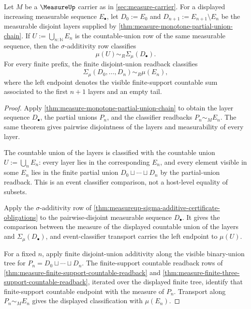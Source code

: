 \begin{theorem}
\label{thm:measure-continuity-from-below-package}
Let $M$ be a $\MeasureUp$ carrier as in \autoref{sec:measure-carrier}. For a
displayed increasing measurable sequence $E_\bullet$, let
$D_0:=E_0$ and $D_{n+1}:=E_{n+1}\setminus E_n$ be the measurable disjoint
layers supplied by
\autoref{thm:measure-monotone-partial-union-chain}. If
$U:=\bigcup_{n:\mathbb{N}}E_n$ is the countable-union row of the same
measurable sequence, then the $\sigma$-additivity row classifies
$$
\mu(U)\sim_R\Sigma_\mu(D_\bullet).
$$
For every finite prefix, the finite disjoint-union readback classifies
$$
\Sigma_\mu(D_0,\ldots,D_n)\sim_R\mu(E_n),
$$
where the left endpoint denotes the visible finite-support countable sum
associated to the first $n+1$ layers and an empty tail.
\end{theorem}
\begin{proof}
Apply \autoref{thm:measure-monotone-partial-union-chain} to obtain the layer
sequence $D_\bullet$, the partial unions $P_n$, and the classifier readbacks
$P_n\sim_M E_n$. The same theorem gives pairwise disjointness of the layers and
measurability of every layer.

The countable union of the layers is classified with the countable union
$U:=\bigcup_nE_n$: every layer lies in the corresponding $E_n$, and every
element visible in some $E_n$ lies in the finite partial union
$D_0\sqcup\cdots\sqcup D_n$ by the partial-union readback. This is an event
classifier comparison, not a host-level equality of subsets.

Apply the $\sigma$-additivity row of
\autoref{thm:measureup-sigma-additive-certificate-obligations} to the
pairwise-disjoint measurable sequence $D_\bullet$. It gives the comparison
between the measure of the displayed countable union of the layers and
$\Sigma_\mu(D_\bullet)$, and event-classifier transport carries the left
endpoint to $\mu(U)$.

For a fixed $n$, apply finite disjoint-union additivity along the visible
binary-union tree for $P_n=D_0\sqcup\cdots\sqcup D_n$. The finite-support
countable readback rows of
\autoref{thm:measure-finite-support-countable-readback} and
\autoref{thm:measure-finite-three-support-countable-readback}, iterated over
the displayed finite tree, identify that finite-support countable endpoint
with the measure of $P_n$. Transport along $P_n\sim_M E_n$ gives the displayed
classification with $\mu(E_n)$.
\end{proof}

